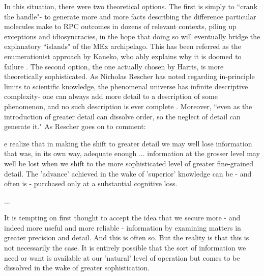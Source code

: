 In this situation, there were two theoretical options. The first is simply to ``crank the handle"- to generate more and more facts describing the difference particular molecules make to RPC outcomes in dozens of relevant contexts, piling up exceptions and idiosyncracies, in the hope that doing so will eventually bridge the explanatory ``islands" of the MEx archipelago. This has been referred as the enumerationist approach by Kaneko, who ably explains why it is doomed to failure \cite[pp.31-32]{Kaneko2006}. The second option, the one actually chosen by Harris, is more theoretically sophisticated. As Nicholas Rescher has noted regarding in-principle limits to scientific knowledge, the phenomenal universe has infinite descriptive complexity- one can always add more detail to a description of some phenomenon, and no such description is ever complete \cite[p.22-9]{Rescher2000}. Moreover, ``even as the introduction of greater detail can dissolve order, so the neglect of detail can generate it." \cite[p.62]{Rescher2000} As Rescher goes on to comment:

\begin{longquote}
[W]e realize that in making the shift to greater detail we may well lose information that was, in its own way, adequate enough ... information at the grosser level may well be lost when we shift to the more sophisticated level of greater fine-grained detail. The 'advance' achieved in the wake of 'superior' knowledge can be - and often is - purchased only at a substantial cognitive loss.

...

It is tempting on first thought to accept the idea that we secure more - and indeed more useful and more reliable - information by examining matters in greater precision and detail. And this is often so. But the reality is that this is not necessarily the case. It is entirely possible that the sort of information we need or want is available at our 'natural' level of operation but comes to be dissolved in the wake of greater sophistication.
\cite[p.65-6]{Rescher2000}
\end{longquote}

